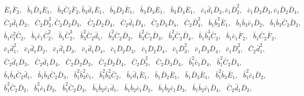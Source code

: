 \documentclass[10pt]{amsart}
\theoremstyle{definition}
\theoremstyle{corollary}
\theoremstyle{remark}
\theoremstyle{conclusion}
\begin{document}
 \begin{align*}
  &\,    \bar{E}_1 \bar{F}_2, \text{ }\bar{b}_1 \bar{D}_4 \bar{E}_1,\text{ }\bar{b}_3 \bar{C}_2 \bar{F}_2,\bar{b}_3 \bar{d}_1 \bar{E}_1,\text{ }\bar{b}_3 \bar{D}_2 \bar{E}_1,\text{ }\bar{b}_3 \bar{D}_3 \bar{E}_1,\text{ }\bar{b}_3 \bar{D}_4 \bar{E}_1,\text{ }\bar{c}_1 \bar{d}_1 \bar{D}_2,\bar{c}_1 \bar{D}_2^2,\text{ }\bar{c}_1 \bar{D}_2 \bar{D}_3,\bar{c}_1 \bar{D}_2 \bar{D}_4, \\
     &\, \bar{C}_2 \bar{d}_1 \bar{D}_2,\text{ }\bar{C}_2 \bar{D}_2^2,\bar{C}_2 \bar{D}_2 \bar{D}_3, \text{ }\bar{C}_2 \bar{D}_2 \bar{D}_4,\text{ }\bar{C}_2 \bar{d}_1 \bar{D}_4, \text{ }\bar{C}_2 \bar{D}_3 \bar{D}_4, \text{ }\bar{C}_2 \bar{D}_4^2,\text{ }\bar{b}_1 \bar{b}_3^2 \bar{E}_1, \text{ }\bar{b}_1 \bar{b}_3 \bar{c}_1 \bar{D}_2, \text{ }\bar{b}_1 \bar{b}_3 \bar{C}_2 \bar{D}_2,   \\
     &\, \bar{b}_1 \bar{c}_1^2 \bar{C}_2,\text{ }  \bar{b}_1 \bar{c}_1 \bar{C}_2^2,\text{ }\bar{b}_1 \bar{C}_2^3, \text{ }\bar{b}_3^2 \bar{C}_2 \bar{d}_1, \text{ }\bar{b}_3^2 \bar{C}_2 \bar{D}_2, \text{ }\bar{b}_3^2 \bar{C}_2 \bar{D}_3, \text{ }\bar{b}_3^2 \bar{C}_2 \bar{D}_4, \text{ }\bar{b}_1 \bar{b}_3^3 \bar{C}_2, \text{ }\bar{b}_1 \bar{c}_1 \bar{F}_2, \text{ }\bar{b}_1 \bar{C}_2 \bar{F}_2,   \\
     &\, \bar{c}_1 \bar{d}_1^2,\text{ }  \bar{c}_1 \bar{d}_1 \bar{D}_2, \text{ }  \bar{c}_1 \bar{d}_1 \bar{D}_3, \text{ }  \bar{c}_1 \bar{d}_1 \bar{D}_4, \text{ }  \bar{c}_1 \bar{D}_2 \bar{D}_3,\text{ }  \bar{c}_1 \bar{D}_2 \bar{D}_4,\text{ }\bar{c}_1 \bar{D}_3^2,\text{  }  \bar{c}_1 \bar{D}_3 \bar{D}_4, \text{ }\bar{c}_1 \bar{D}_4^2, \text{ }\bar{C}_2 \bar{d}_1^2,  \\
     &\,   \bar{C}_2 \bar{d}_1 \bar{D}_3, \text{ }  \bar{C}_2 \bar{d}_1 \bar{D}_4, \text{ }  \bar{C}_2 \bar{D}_2 \bar{D}_3, \text{ }  \bar{C}_2 \bar{D}_2 \bar{D}_4, \text{ }\bar{C}_2 \bar{D}_3^2, \text{ }  \bar{C}_2 \bar{D}_3 \bar{D}_4, \text{ }\bar{b}_1^2 \bar{c}_1 \bar{D}_4, \text{ }\bar{b}_1^2 \bar{C}_2 \bar{D}_4, \\
    &\, \bar{b}_1 \bar{b}_3 \bar{C}_2 \bar{d}_1, \text{ }\bar{b}_1 \bar{b}_3 \bar{C}_2 \bar{D}_3, \text{ }\bar{b}_1^2 \bar{b}_3^2 \bar{c}_1, \text{ }\bar{b}_1^2 \bar{b}_3^2 \bar{C}_2, \text{ }\bar{b}_1 \bar{d}_1 \bar{E}_1, \text{ }\bar{b}_1 \bar{D}_2 \bar{E}_1, \text{ }\bar{b}_1 \bar{D}_3 \bar{E}_1, \text{ }\bar{b}_1^2 \bar{b}_3 \bar{E}_1, \text{ }\bar{b}_1^2 \bar{c}_1 \bar{D}_2, \\
     &\, \bar{b}_1^2 \bar{C}_2 \bar{D}_2, \text{ }\bar{b}_1^2 \bar{c}_1 \bar{D}_3, \text{ }\bar{b}_1^2 \bar{C}_2 \bar{D}_3, \text{ }\bar{b}_1 \bar{b}_2 \bar{c}_1 \bar{d}_1, \text{ }\bar{b}_1 \bar{b}_2 \bar{c}_1 \bar{D}_2, \text{ }\bar{b}_1 \bar{b}_2 \bar{c}_1 \bar{D}_3, \text{ }\bar{b}_1 \bar{b}_2 \bar{c}_1 \bar{D}_4, \text{ }   \bar{C}_2 \bar{d}_1 \bar{D}_2,\\

\end{align*}
\end{document}
